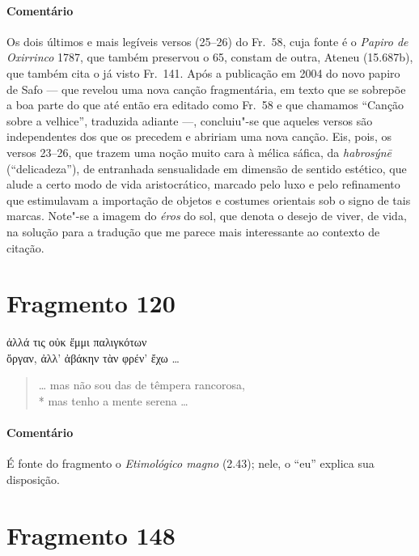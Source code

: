 {{\paragraph{Comentário} Os dois últimos e mais legíveis versos (25--26) do Fr.~58, cuja fonte é o
\textit{Papiro de Oxirrinco }1787, que também preservou o 65, constam de outra, Ateneu (15.687b), que também cita o já visto Fr.~141. Após a publicação em 2004 do
novo papiro de Safo --- que revelou uma nova canção fragmentária, em texto que se
sobrepõe a boa parte do que até então era editado como Fr.~58 e que chamamos ``Canção sobre a velhice'', traduzida adiante ---, concluiu"-se que aqueles
versos são independentes dos que os precedem e abririam uma nova canção. Eis, pois, os versos 23--26, que
trazem uma noção muito cara à mélica sáfica, da \textit{habrosýnē}
(``delicadeza”), de entranhada sensualidade em dimensão de sentido
estético, que alude a certo modo de vida aristocrático, marcado pelo luxo e pelo
refinamento que estimulavam a importação de objetos e costumes orientais
sob o signo de tais marcas. Note"-se a imagem do \textit{éros} do sol, que denota o desejo de viver, de vida, na solução para a tradução que me parece mais interessante ao contexto de citação.}



\section{Fragmento 120}

\begin{gkverse}
ἀλλά τις οὐκ ἔμμι παλιγκότων\\
ὄργαν, ἀλλ’ ἀβάκην τὰν φρέν’ ἔχω \ldots{}
\end{gkverse}

\begin{verse}
\ldots{} mas não sou das de têmpera rancorosa,\\*
mas tenho a mente serena \ldots{}
\end{verse}

{\paragraph{Comentário} É fonte do fragmento o \textit{Etimológico magno} (2.43); nele, o “eu” explica sua disposição.}


\section{Fragmento 148}

}
